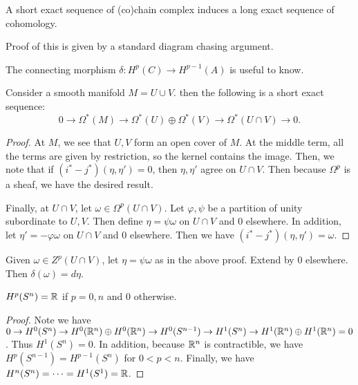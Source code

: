 \documentclass[twoside, 10pt]{article}
\begin{document}
    \begin{lem}
        A short exact sequence of (co)chain complex induces a long exact sequence of cohomology.
    \end{lem}

    Proof of this is given by a standard diagram chasing argument.

    \begin{rmk}
        The connecting morphism $\delta: H^p(C) \to H^{p-1}(A)$ is useful to know.
    \end{rmk}

    \begin{thm}
        Consider a smooth manifold $M = U \cup V$. then the following is a short exact sequence:
        \[ 0 \to \Omega^*(M) \to \Omega^*(U) \oplus \Omega^*(V) \to \Omega^*(U \cap V) \to 0.\]
    \end{thm}

    \begin{proof}
        At $M$, we see that $U,V$ form an open cover of $M$. At the middle term, all the terms are given by restriction, so the kernel contains the image. Then, we note that if $(i^* - j^*)(\eta, \eta') = 0$, then $\eta, \eta'$ agree on $U \cap V$. Then because $\Omega^p$ is a sheaf, we have the desired result.

        Finally, at $U \cap V$, let $\omega \in \Omega^p(U \cap V)$. Let $\varphi, \psi$ be a partition of unity subordinate to $U,V$. Then define $\eta = \psi \omega$ on $U \cap V$ and $0$ elsewhere. In addition, let $\eta' = -\varphi\omega$ on $U \cap V$ and $0$ elsewhere. Then we have $(i^*-j^*)(\eta, \eta') = \omega$.
    \end{proof}

    \begin{cor}
        Given $\omega \in Z^p(U \cap V)$, let $\eta = \psi\omega$ as in the above proof. Extend by $0$ elsewhere. Then $\delta(\omega) = d\eta$.
    \end{cor}

    \begin{thm}
        $H^p(S^n) = \mathbb{R}$ if $p = 0,n$ and  $0$ otherwise.
    \end{thm}

    \begin{proof}
        Note we have $0 \to H^0(S^n) \to H^0(\mathbb{R}^n) \oplus H^0(\mathbb{R}^n) \to H^0(S^{n-1}) \to H^1(S^n) \to H^1(\mathbb{R}^n) \oplus H^1(\mathbb{R}^n) = 0$. Thus $H^1(S^n) = 0$.  In addition, because $\mathbb{R}^n$ is contractible, we have $H^p(S^{n-1}) = H^{p-1}(S^n)$ for $0 < p < n$. Finally, we have $H^n(S^n) = \cdots = H^1(S^1) = \mathbb{R}$.
    \end{proof}
\end{document}
